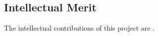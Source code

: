 \subsection{Intellectual Merit}
\label{sec:merit}

The intellectual contributions of this project are
.
